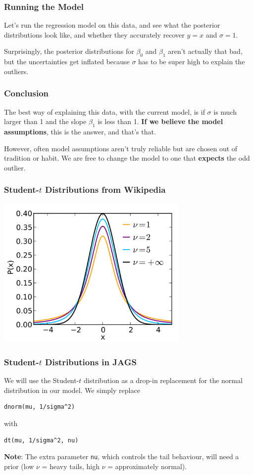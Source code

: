 \documentclass{beamer}
\begin{document}
\begin{frame}
\frametitle{Running the Model}
Let's run the regression model on this data, and see what the posterior
distributions look like, and whether they accurately recover
$y=x$ and $\sigma=1$.\pause

Surprisingly, the posterior distributions for $\beta_0$ and $\beta_1$ aren't
actually that bad, but the uncertainties get inflated because $\sigma$ has
to be super high to explain the outliers.
\end{frame}


\begin{frame}
\frametitle{Conclusion}
The best way of explaining this data, with the current model, is if $\sigma$
is much larger than 1 and the slope $\beta_1$ is less than 1.
{\bf If we believe the model assumptions}, this is the
answer, and that's that.\pause

However, often model assumptions aren't truly reliable but are chosen out of
tradition or habit. We are free to change the model to one that
{\bf expects} the odd outlier.
\end{frame}


\begin{frame}
\frametitle{Student-$t$ Distributions from Wikipedia}

\begin{center}
\includegraphics[width=0.7\textwidth]{images/t_distribution.png}
\end{center}
\end{frame}

\begin{frame}[fragile]
\frametitle{Student-$t$ Distributions in JAGS}
We will use the Student-$t$ distribution as a drop-in replacement for the
normal distribution in our model. We simply replace
\begin{verbatim}
dnorm(mu, 1/sigma^2)
\end{verbatim}
with
\begin{verbatim}
dt(mu, 1/sigma^2, nu)
\end{verbatim}
\pause
{\bf Note}: The extra parameter \texttt{nu}, which controls the
tail behaviour, will need a prior (low $\nu$ = heavy tails,
high $\nu$ = approximately normal).
\end{frame}
\end{document}
